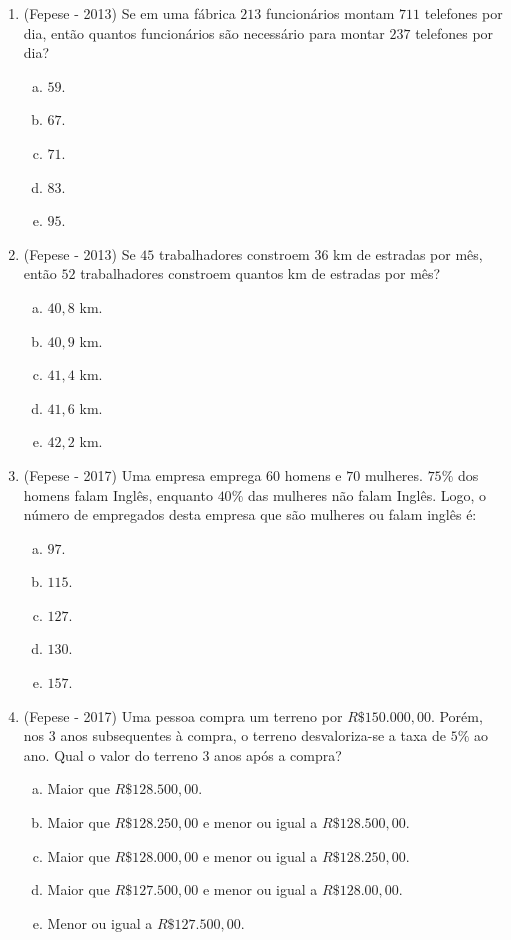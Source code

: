 \begin{enumerate}
 \item (Fepese - 2013) Se em uma fábrica $213$ funcionários montam $711$ telefones por dia, então quantos funcionários são necessário para montar $237$ telefones por dia?
 \begin{enumerate}[a)]
   \item $59$.
   \item $67$.
   \item $71$.
   \item $83$.
   \item $95$.
   \end{enumerate}
   
 \item (Fepese - 2013) Se $45$ trabalhadores constroem $36$ km de estradas por mês, então $52$ trabalhadores constroem quantos km de estradas por mês?
 \begin{enumerate}[a)]
   \item $40,8$ km.
   \item $40,9$ km.
   \item $41,4$ km.
   \item $41,6$ km.
   \item $42,2$ km.
   \end{enumerate}

  \item (Fepese - 2017) Uma empresa emprega $60$ homens e $70$ mulheres. $75\%$ dos homens falam Inglês, enquanto $40\%$ das mulheres não falam Inglês. Logo, o número de empregados desta empresa que são mulheres ou falam inglês é:
 \begin{enumerate}[a)]
   \item $97$.
   \item $115$.
   \item $127$.
   \item $130$.
   \item $157$.
   \end{enumerate}

   \item (Fepese - 2017) Uma pessoa compra um terreno por $R\$ 150.000,00$. Porém, nos $3$ anos subsequentes à compra, o terreno desvaloriza-se a taxa de $5\%$ ao ano. Qual o valor do terreno $3$ anos após a compra?
  \begin{enumerate}[a)]
   \item Maior que $R\$ 128.500,00$.
   \item Maior que $R\$ 128.250,00$ e menor ou igual a $R\$128.500,00$.
   \item Maior que $R\$ 128.000,00$ e menor ou igual a $R\$128.250,00$.
   \item Maior que $R\$ 127.500,00$ e menor ou igual a $R\$128.00,00$.
   \item Menor ou igual a $R\$ 127.500,00$.
   \end{enumerate}
   

\end{enumerate}
